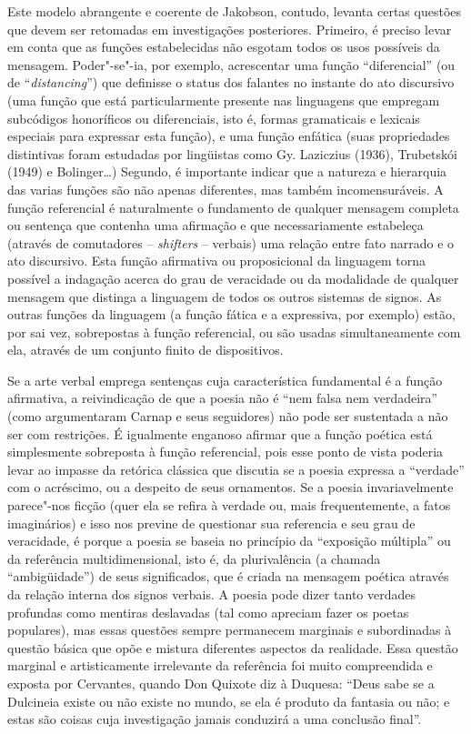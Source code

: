 Este modelo abrangente e coerente de Jakobson, contudo, levanta certas
questões que devem ser retomadas em investigações posteriores. Primeiro,
é preciso levar em conta que as funções estabelecidas não esgotam todos
os usos possíveis da mensagem. Poder"-se"-ia, por exemplo, acrescentar uma
função ``diferencial'' (ou de ``\emph{distancing}'') que definisse o
status dos falantes no instante do ato discursivo (uma função que está
particularmente presente nas linguagens que empregam subcódigos
honoríficos ou diferenciais, isto é, formas gramaticais e lexicais
especiais para expressar esta função), e uma função enfática (suas
propriedades distintivas foram estudadas por lingüistas como Gy.
Laziczius (1936), Trubetskói (1949) e Bolinger\ldots{}) Segundo, é importante
indicar que a natureza e hierarquia das varias funções são não apenas
diferentes, mas também incomensuráveis. A função referencial é
naturalmente o fundamento de qualquer mensagem completa ou sentença que
contenha uma afirmação e que necessariamente estabeleça (através de
comutadores -- \emph{shifters} -- verbais) uma relação entre fato
narrado e o ato discursivo. Esta função afirmativa ou proposicional da
linguagem torna possível a indagação acerca do grau de veracidade ou da
modalidade de qualquer mensagem que distinga a linguagem de todos os
outros sistemas de signos. As outras funções da linguagem (a função
fática e a expressiva, por exemplo) estão, por sai vez, sobrepostas à
função referencial, ou são usadas simultaneamente com ela, através de um
conjunto finito de dispositivos.

Se a arte verbal emprega sentenças cuja característica fundamental é a
função afirmativa, a reivindicação de que a poesia não é ``nem falsa nem
verdadeira'' (como argumentaram Carnap e seus seguidores) não pode ser
sustentada a não ser com restrições. É igualmente enganoso afirmar que a
função poética está simplesmente sobreposta à função referencial, pois
esse ponto de vista poderia levar ao impasse da retórica clássica que
discutia se a poesia expressa a ``verdade'' com o acréscimo, ou a
despeito de seus ornamentos. Se a poesia invariavelmente parece"-nos
ficção (quer ela se refira à verdade ou, mais frequentemente, a fatos
imaginários) e isso nos previne de questionar sua referencia e seu grau
de veracidade, é porque a poesia se baseia no princípio da ``exposição
múltipla'' ou da referência multidimensional, isto é, da plurivalência
(a chamada ``ambigüidade'') de seus significados, que é criada na
mensagem poética através da relação interna dos signos verbais. A poesia
pode dizer tanto verdades profundas como mentiras deslavadas (tal como
apreciam fazer os poetas populares), mas essas questões sempre
permanecem marginais e subordinadas à questão básica que opõe e mistura
diferentes aspectos da realidade. Essa questão marginal e artisticamente
irrelevante da referência foi muito compreendida e exposta por
Cervantes, quando Don Quixote diz à Duquesa: ``Deus sabe se a Dulcineia
existe ou não existe no mundo, se ela é produto da fantasia ou não; e
estas são coisas cuja investigação jamais conduzirá a uma conclusão
final''.

